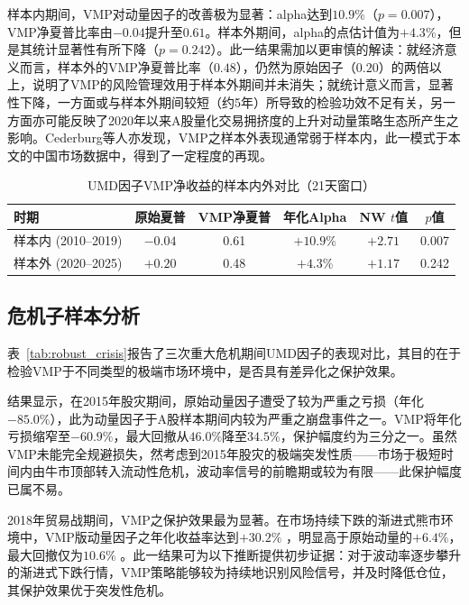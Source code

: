 \documentclass[
    decl-page,
    oneside,
  ]{njuthesis}
\begin{document}
样本内期间，VMP对动量因子的改善极为显著：alpha达到$10.9\%$（$p = 0.007$），VMP净夏普比率由$-0.04$提升至$0.61$。样本外期间，alpha的点估计值为$+4.3\%$，但是其统计显著性有所下降（$p = 0.242$）。此一结果需加以更审慎的解读：就经济意义而言，样本外的VMP净夏普比率（$0.48$），仍然为原始因子（$0.20$）的两倍以上，说明了VMP的风险管理效用于样本外期间并未消失；就统计意义而言，显著性下降，一方面或与样本外期间较短（约5年）所导致的检验功效不足有关，另一方面亦可能反映了2020年以来A股量化交易拥挤度的上升对动量策略生态所产生之影响。Cederburg等人\cite{cederburg2020performance}亦发现，VMP之样本外表现通常弱于样本内，此一模式于本文的中国市场数据中，得到了一定程度的再现。

\begin{table}[htbp]
  \centering
  \caption{UMD因子VMP净收益的样本内外对比（21天窗口）}
  \label{tab:robust_insample}
  \begin{tabular}{lccccc}
    \toprule
    时期 & 原始夏普 & VMP净夏普 & 年化Alpha & NW $t$值 & $p$值 \\
    \midrule
    样本内 (2010--2019) & $-0.04$ & 0.61 & $+10.9\%$ & $+2.71$ & 0.007 \\
    样本外 (2020--2025) & $+0.20$ & 0.48 & $+4.3\%$ & $+1.17$ & 0.242 \\
    \bottomrule
  \end{tabular}
\end{table}

\subsection{危机子样本分析}

表~\ref{tab:robust_crisis}报告了三次重大危机期间UMD因子的表现对比，其目的在于检验VMP于不同类型的极端市场环境中，是否具有差异化之保护效果。

结果显示，在2015年股灾期间，原始动量因子遭受了较为严重之亏损（年化$-85.0\%$），此为动量因子于A股样本期间内较为严重之崩盘事件之一。VMP将年化亏损缩窄至$-60.9\%$，最大回撤从$46.0\%$降至$34.5\%$，保护幅度约为三分之一。虽然VMP未能完全规避损失，然考虑到2015年股灾的极端突发性质——市场于极短时间内由牛市顶部转入流动性危机，波动率信号的前瞻期或较为有限——此保护幅度已属不易。

2018年贸易战期间，VMP之保护效果最为显著。在市场持续下跌的渐进式熊市环境中，VMP版动量因子之年化收益率达到$+30.2\%$ ，明显高于原始动量的$+6.4\%$，最大回撤仅为$10.6\%$ 。此一结果可为以下推断提供初步证据：对于波动率逐步攀升的渐进式下跌行情，VMP策略能够较为持续地识别风险信号，并及时降低仓位，其保护效果优于突发性危机。
\end{document}
